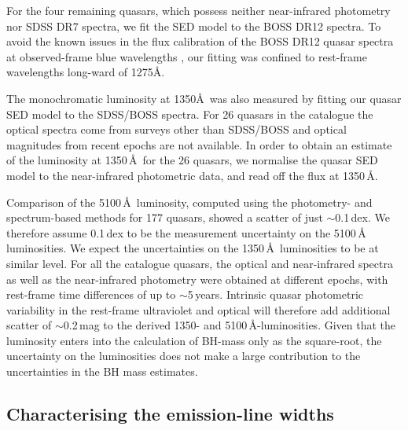 For the four remaining quasars, which possess neither near-infrared photometry nor SDSS DR7 spectra, we fit the SED model to the BOSS DR12 spectra. 
To avoid the known issues in the flux calibration of the BOSS DR12 quasar spectra at observed-frame blue wavelengths \citep{lee13}, our fitting was confined to rest-frame wavelengths long-ward of 1275\AA. 

The monochromatic luminosity at 1350\AA\, was also measured by fitting our quasar SED model to the SDSS/BOSS spectra. 
For 26 quasars in the catalogue the optical spectra come from surveys other than SDSS/BOSS and optical magnitudes from recent epochs are not available. 
In order to obtain an estimate of the luminosity at 1350\,\AA\, for the 26 quasars, we normalise the quasar SED model to the near-infrared photometric data, and read off the flux at 1350\,\AA. 

Comparison of the 5100\,\AA\, luminosity, computed using the photometry- and spectrum-based methods for 177 quasars, showed a scatter of just $\sim$0.1\,dex.
We therefore assume 0.1\,dex to be the measurement uncertainty on the 5100\,\AA\, luminosities.
We expect the uncertainties on the 1350\,\AA\, luminosities to be at similar level.  
For all the catalogue quasars, the optical and near-infrared spectra as well as the near-infrared photometry were obtained at different epochs, with rest-frame time differences of up to $\sim$5\,years. 
Intrinsic quasar photometric variability in the rest-frame ultraviolet and optical will therefore add additional scatter of $\sim$0.2\,mag \citep[e.g.][]{macleod10} to the derived 1350- and 5100\,\AA-luminosities. 
Given that the luminosity enters into the calculation of BH-mass only as the square-root, the uncertainty on the luminosities does not make a large contribution to the uncertainties in the BH mass estimates.  

\subsection{Characterising the emission-line widths}
\label{sub:charemprof}

